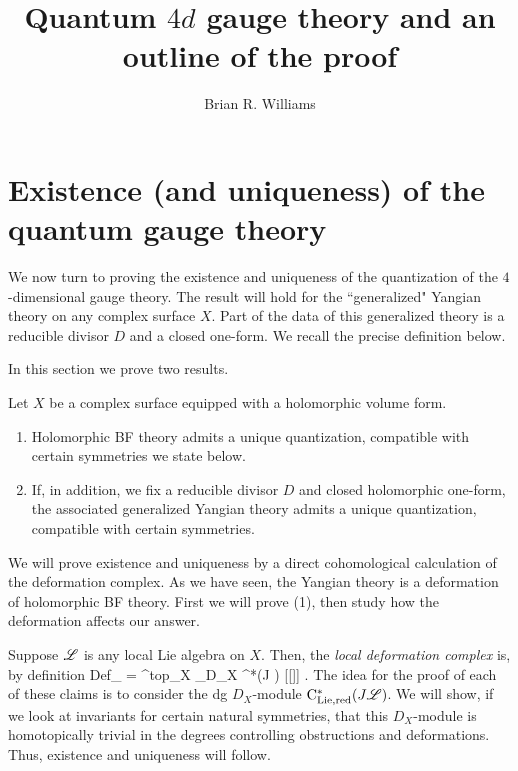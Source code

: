 \documentclass[11pt]{amsart}
\title{Quantum $4d$ gauge theory and an outline of the proof}
\author{Brian R. Williams}
\date{}
\begin{document}
\maketitle
 

\section{Existence (and uniqueness) of the quantum gauge theory}

We now turn to proving the existence and uniqueness of the quantization of the $4$-dimensional gauge theory. 
The result will hold for the ``generalized" Yangian theory on any complex surface $X$.
Part of the data of this generalized theory is a reducible divisor $D$ and a closed one-form. 
We recall the precise definition below. 

In this section we prove two results.

\begin{thm}\label{thm: bv quantization}
Let $X$ be a complex surface equipped with a holomorphic volume form. 
\begin{enumerate}
\item Holomorphic BF theory admits a unique quantization, compatible with certain symmetries we state below. 
\item If, in addition, we fix a reducible divisor $D$ and closed holomorphic one-form, the associated generalized Yangian theory admits a unique quantization, compatible with certain symmetries. 
\end{enumerate}
\end{thm}

We will prove existence and uniqueness by a direct cohomological calculation of the deformation complex. 
As we have seen, the Yangian theory is a deformation of holomorphic BF theory.
First we will prove (1), then study how the deformation affects our answer. 

Suppose $\mathscr L$ is any local Lie algebra on $X$. 
Then, the {\em local deformation complex} is, by definition
\beqn\label{def}
{\rm Def}_{\sL} = \Omega^{top}_X \tensor_{D_X} \hbar \cred^*(J \sL) [[\hbar]] .
\eeqn
The idea for the proof of each of these claims is to consider the dg $D_X$-module ${\rm C}_{\rm Lie, red}^*(J \mathscr L)$. 
We will show, if we look at invariants for certain natural symmetries, that this $D_X$-module is homotopically trivial in the degrees controlling obstructions and deformations. 
Thus, existence and uniqueness will follow. 

\subsubsection{}
\end{document}
